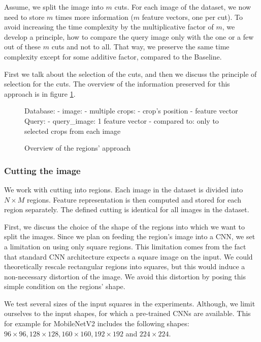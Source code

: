 Assume, we split the image into $m$ cuts. For each image of the dataset, we now need to store $m$ times more information ($m$ feature vectors, one per cut). To avoid increasing the time complexity by the multiplicative factor of $m$, we develop a principle, how to compare the query image only with the one or a few out of these $m$ cuts and not to all. That way, we preserve the same time complexity except for some additive factor, compared to the Baseline.

First we talk about the selection of the cuts, and then we discuss the principle of selection for the cuts. The overview of the information preserved for this approach is in figure \ref{fig:overview_regions}.

\begin{figure}
\centering
\begin{boxedverbatim}
Database:
    - image:
        - multiple crops:
            - crop's position
            - feature vector
Query:
    - query_image: 1 feature vector
    - compared to: only to selected crops from each image
\end{boxedverbatim}
\caption{Overview of the regions' approach}
\label{fig:overview_regions}
\end{figure}

\subsubsection{Cutting the image}

We work with cutting into regions. Each image in the dataset is divided into $N \times M$ regions. Feature representation is then computed and stored for each region separately. The defined cutting is identical for all images in the dataset.

First, we discuss the choice of the shape of the regions into which we want to split the images. Since we plan on feeding the region's image into a CNN, we set a limitation on using only square regions. This limitation comes from the fact that standard CNN architecture expects a square image on the input. We could theoretically rescale rectangular regions into squares, but this would induce a non-necessary distortion of the image. We avoid this distortion by posing this simple condition on the regions' shape.

We test several sizes of the input squares in the experiments. Although, we limit ourselves to the input shapes, for which a pre-trained CNNs are available. This for example for MobileNetV2 includes the following shapes: $96 \times 96, 128 \times 128, 160 \times 160, 192 \times 192$ and $224 \times 224$.

